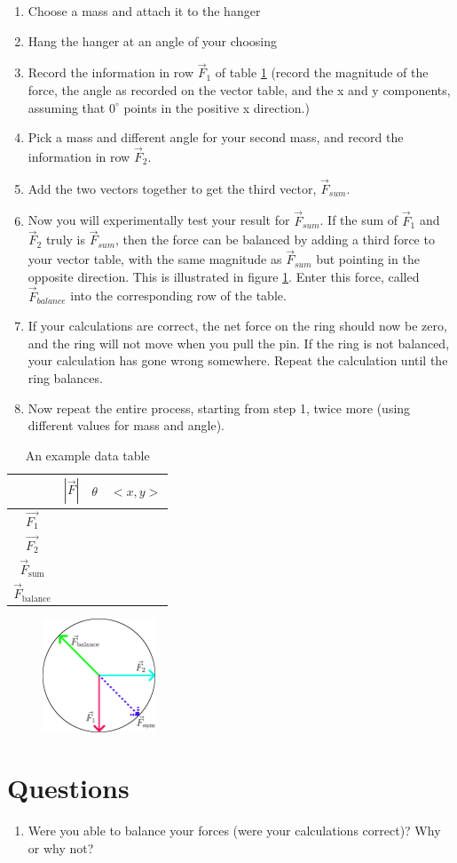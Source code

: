 \documentclass{article}
\begin{document}
\begin{enumerate}
	\item Choose a mass and attach it to the hanger
	\item Hang the hanger at an angle of your choosing
	\item Record the information in row $\vec{F}_1$ of table \ref{tab} (record the magnitude of the force, the angle as recorded on the vector table, and the x and y components, assuming that $0^\circ$ points in the positive x direction.)
	\item Pick a mass and different angle for your second mass, and record the information in row $\vec{F}_2$.
	\item Add the two vectors together to get the third vector, $\vec{F}_{sum}$.
	\item Now you will experimentally test your result for $\vec{F}_{sum}$. If the sum of $\vec{F}_1$ and $\vec{F}_2$ truly is $\vec{F}_{sum}$, then the force can be balanced by adding a third force to your vector table, with the same magnitude as $\vec{F}_{sum}$ but pointing in the opposite direction. This is illustrated in figure \ref{fig1}. Enter this force, called $\vec{F}_{balance}$ into the corresponding row of the table.
	\item If your calculations are correct, the net force on the ring should now be zero, and the ring will not move when you pull the pin. If the ring is not balanced, your calculation has gone wrong somewhere. Repeat the calculation until the ring balances.
	\item Now repeat the entire process, starting from step 1, twice more (using different values for mass and angle).
	
\end{enumerate}

\begin{table}
	\centering
	\begin{tabular}{|c|c|c|c|}
		\hline
		& $|\vec{F}|$&$\theta$&$<x,y>$\\
		\hline
		$\vec{F_1}$ & & & \\
		\hline
		$\vec{F_2}$& & & \\
		\hline
		$\vec{F}_\mathrm{sum}$ & & & \\
		\hline
		$\vec{F}_\mathrm{balance}$ & & & \\
		\hline 
	\end{tabular}
	\caption{An example data table}
	\label{tab}
\end{table}
\begin{figure}
	\centering
	\includegraphics[width=0.3\textwidth]{diagram.jpg}
	\caption{}
	\label{fig1}
\end{figure}

\section*{Questions}
\begin{enumerate}
	\item Were you able to balance your forces (were your calculations correct)? Why or why not?
\end{enumerate}
\end{document}
